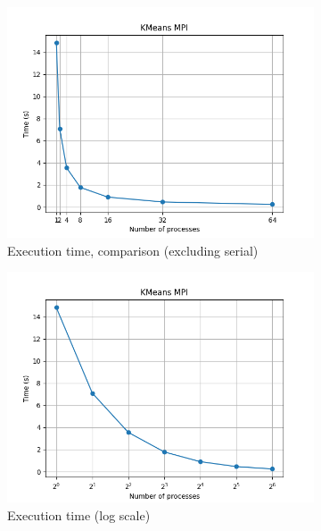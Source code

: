 \documentclass{article}
\begin{document}
\begin{figure}[h]
    \centering
    \begin{subfigure}{0.45\textwidth}
        \includegraphics[width=\textwidth]{a5/plots/kmeans_mpi.png}
        \caption{Execution time, comparison (excluding serial)}
    \end{subfigure}
    \begin{subfigure}{0.45\textwidth}
        \includegraphics[width=\textwidth]{a5/plots/kmeans_mpi_log.png}
        \caption{Execution time (log scale)}
    \end{subfigure}
    \vspace{1em}
    \begin{subfigure}{0.45\textwidth}

\end{subfigure}
\end{figure}
\end{document}
